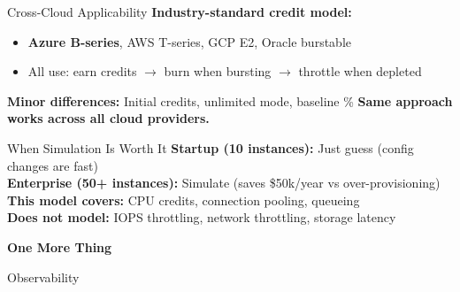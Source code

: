\documentclass[11pt, aspectratio=169]{beamer}
\begin{document}
\begin{frame}{Cross-Cloud Applicability}
    \textbf{Industry-standard credit model:}
    \begin{itemize}
        \item \textbf{Azure B-series}, AWS T-series, GCP E2, Oracle burstable
        \item All use: earn credits $\to$ burn when bursting $\to$ throttle when depleted
    \end{itemize}

    \vfill
    \textbf{Minor differences:} Initial credits, unlimited mode, baseline \%
    \vfill
    \textbf{Same approach works across all cloud providers.}
\end{frame}

\begin{frame}{When Simulation Is Worth It}
    \textbf{Startup (10 instances):} Just guess (config changes are fast) \\
    \textbf{Enterprise (50+ instances):} Simulate (saves \$50k/year vs over-provisioning)
    \vfill
    \textbf{This model covers:} CPU credits, connection pooling, queueing \\
    \textbf{Does not model:} IOPS throttling, network throttling, storage latency
\end{frame}

\begin{frame}
    \begin{center}
        \Large\textbf{One More Thing}
        \vspace{1.5em}
        
        \large\color{blue}Observability
    \end{center}
\end{frame}
\end{document}
